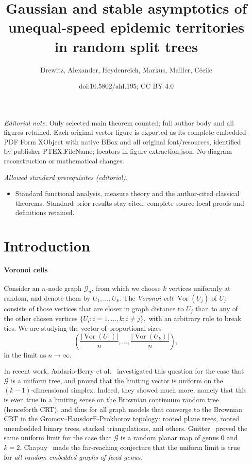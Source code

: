 \documentclass[10pt]{amsart}
\title{Gaussian and stable asymptotics of unequal-speed epidemic territories in random split trees}
\author{Drewitz, Alexander, Heydenreich, Markus, Mailler, Cécile}
\date{doi:10.5802/ahl.195; CC BY 4.0}
\theoremstyle{definition}\newtheorem{defi}[theo]{Definition}\newtheorem{rema}[theo]{Remark}\newtheorem{exam}[theo]{Example}\newtheorem{exem}[theo]{Example}\newtheorem{nota}[theo]{Notation}
\newcommand{\Vor}{\operatorname{Vor}}
\newcommand{\clG}{\mathcal{G}}
\begin{document}
\maketitle
\noindent\textit{Editorial note.} Only selected main theorem counted; full author body and all figures retained. Each original vector figure is exported as its complete embedded PDF Form XObject with native BBox and all original font/resources, identified by publisher PTEX.FileName; locators in figure-extraction.json. No diagram reconstruction or mathematical changes.\par\medskip
\noindent\textit{Allowed standard prerequisites (editorial).}\begin{itemize}
\item Standard functional analysis, measure theory and the author-cited classical theorems. Standard prior results stay cited; complete source-local proofs and definitions retained.
\end{itemize}\medskip

\section{Introduction}\label{sec:intro}
\paragraph*{Voronoi cells}
Consider an $n$-node graph $\clG_n$, from which we choose $k$ vertices uniformly at random, and denote them by $U_1,\dots,U_k$. The \emph{Voronoi cell} $\Vor(U_j)$ of $U_j$ consists of those vertices that are closer in graph distance to $U_j$ than to any of the other chosen vertices $\{U_i\colon i=1,\dots,k; i\neq j\},$ with an arbitrary rule to break ties. We are studying the vector of proportional sizes
\[
\left(\frac{|\Vor(U_1)|}n,\dots,\frac{|\Vor(U_k)|}n\right),
\]
in the limit as $n\to\infty$.

In recent work, Addario-Berry et al.~\cite{Chapuy} investigated this question for the case that $\clG$ is a uniform tree, and proved that the limiting vector is uniform on the $(k-1)$-dimensional simplex. Indeed, they showed much more, namely that this is even true in a limiting sense on the Brownian continuum random tree (henceforth CRT), and thus for all graph models that converge to the Brownian CRT in the Gromov--Hausdorff--Prokhorov topology: rooted plane trees, rooted unembedded binary trees, stacked triangulations, and others. Guitter~\cite{Guitter_2017} proved the same uniform limit for the case that $\clG$ is a random planar map of genus 0 and $k=2$. Chapuy~\cite{Chapu19} made the far-reaching conjecture that the uniform limit is true for \emph{all random embedded graphs of fixed genus}.
\end{document}
